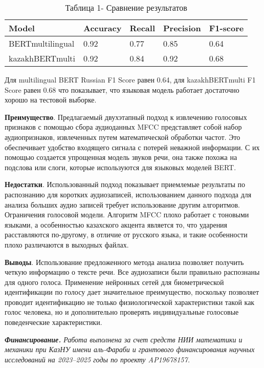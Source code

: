 \begin{table}[H]
\caption*{Таблица 1- Сравнение результатов}
\centering
\begin{tabular}{|l|l|l|l|l|}
\hline
Model            & Accuracy & Recall & Precision & F1-score \\ \hline
BERTmultilingual & 0.92     & 0.77   & 0.85      & 0.64     \\ \hline
kazakhBERTmulti  & 0.92     & 0.84   & 0.92      & 0.68     \\ \hline
\end{tabular}
\end{table}

\begin{multicols}{2}
Для multilingual BERT Russian F1 Score равен 0.64, для kazakhBERTmulti
F1 Score равен 0.68 что показывает, что языковая модель работает
достаточно хорошо на тестовой выборке.

{\bfseries Преимущество}. Предлагаемый двухэтапный подход к извлечению
голосовых признаков с помощью сбора аудиоданных MFCC представляет собой
набор аудиопризнаков, извлеченных путем математической обработки частот.
Это обеспечивает удобство входящего сигнала с потерей неважной
информации. С их помощью создается упрощенная модель звуков речи, она
также похожа на подслова или слоги, которые используются для языковых
моделей BERT.

{\bfseries Недостатки}. Использованный подход показывает приемлемые
результаты по распознанию для коротких аудиозаписей, использованием
данного подхода для анализа больших аудио записей требует использование
другим алгоритмов. Ограничения голосовой модели. Алгоритм MFCC плохо
работает с тоновыми языками, а особенностью казахского акцента является
то, что ударения расставляются по-другому, в отличие от русского языка,
и такие особенности плохо различаются в выходных файлах.

{\bfseries Выводы}. Использование предложенного метода анализа позволяет
получить четкую информацию о тексте речи. Все аудиозаписи были правильно
распознаны для одного голоса. Применение нейронных сетей для
биометрической идентификации по голосу дает значительное преимущество,
поскольку позволяет проводит идентификацию не только физиологической
характеристики такой как голос человека, но и дополнительно проверять
индивидуальные голосовые поведенческие характеристики.

\emph{{\bfseries Финансирование.} Работа выполнена за счет средств НИИ
математики и механики при КазНУ имени аль-Фараби и грантового
финансирования научных исследований на 2023--2025 годы по проекту
AP19678157.}
\end{multicols}

